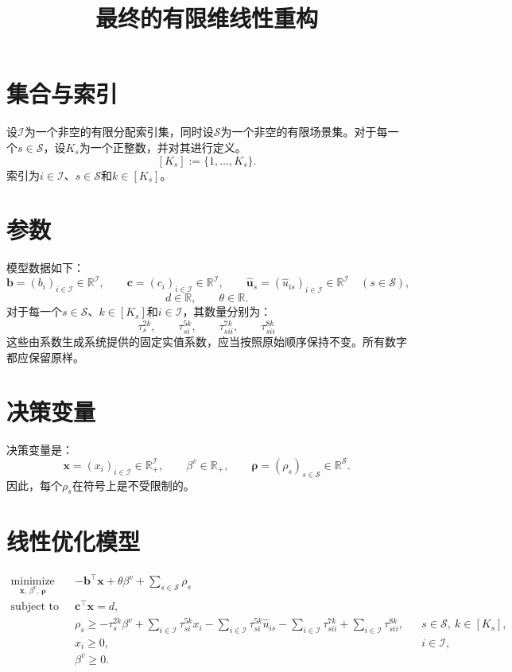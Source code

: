 \documentclass{article}
\title{最终的有限维线性重构}
\author{}
\date{}
\begin{document}
\maketitle

\section*{集合与索引}
设\(\mathcal I\)为一个非空的有限分配索引集，同时设\(\mathcal S\)为一个非空的有限场景集。对于每一个\(s\in\mathcal S\)，设\(K_s\)为一个正整数，并对其进行定义。
\[
[K_s]:=\{1,\ldots,K_s\}.
\]
索引为\(i\in\mathcal I\)、\(s\in\mathcal S\)和\(k\in[K_s]\)。

\section*{参数}
模型数据如下：
\[
\boldsymbol b=(b_i)_{i\in\mathcal I}\in\mathbb R^{\mathcal I},
\qquad
\boldsymbol c=(c_i)_{i\in\mathcal I}\in\mathbb R^{\mathcal I},
\qquad
\hat{\boldsymbol u}_s=(\hat u_{is})_{i\in\mathcal I}\in\mathbb R^{\mathcal I}
\quad(s\in\mathcal S),
\]
\[
d\in\mathbb R,
\qquad
\theta\in\mathbb R.
\]
对于每一个\(s\in\mathcal S\)、\(k\in[K_s]\)和\(i\in\mathcal I\)，其数量分别为：
\[
\tau_s^{2k},\qquad
\tau_{si}^{5k},\qquad
\tau_{sii}^{7k},\qquad
\tau_{sii}^{8k}
\]
这些由系数生成系统提供的固定实值系数，应当按照原始顺序保持不变。所有数字都应保留原样。

\section*{决策变量}
决策变量是：
\[
\boldsymbol x=(x_i)_{i\in\mathcal I}\in\mathbb R_+^{\mathcal I},
\qquad
\beta^v\in\mathbb R_+,
\qquad
\boldsymbol\rho=(\rho_s)_{s\in\mathcal S}\in\mathbb R^{\mathcal S}.
\]
因此，每个\(\rho_s\)在符号上是不受限制的。

\section*{线性优化模型}
\begin{align}
\underset{\boldsymbol x,\,\beta^v,\,\boldsymbol\rho}{\operatorname{minimize}}
\quad &
-\boldsymbol b^{\top}\boldsymbol x
+\theta\beta^v
+\sum_{s\in\mathcal S}\rho_s
\tag{25a}\\
\text{subject to}\quad
&\boldsymbol c^{\top}\boldsymbol x=d,
\tag{25b}\\
&\rho_s\ge
-\tau_s^{2k}\beta^v
+\sum_{i\in\mathcal I}\tau_{si}^{5k}x_i
-\sum_{i\in\mathcal I}\tau_{si}^{5k}\hat u_{is}
-\sum_{i\in\mathcal I}\tau_{sii}^{7k}
+\sum_{i\in\mathcal I}\tau_{sii}^{8k},
&&s\in\mathcal S,\ k\in[K_s],
\tag{25c}\\
&x_i\ge 0,
&&i\in\mathcal I,
\tag{25d-1}\\
&\beta^v\ge 0.
\tag{25d-2}
\end{align}
\end{document}

